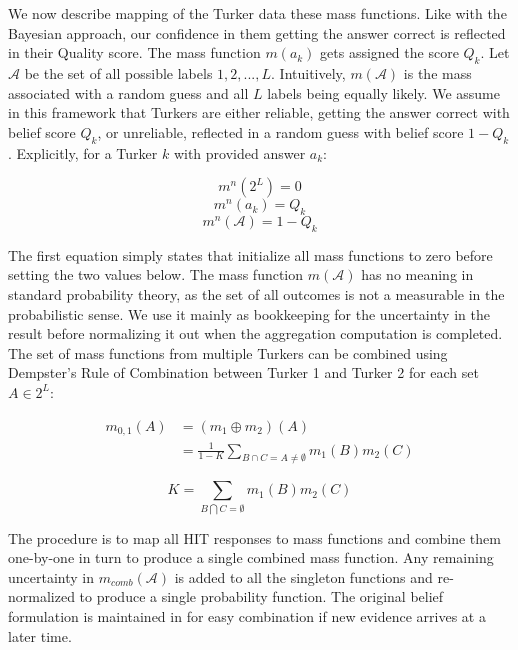 We now describe mapping of the Turker data these mass functions.  Like with the Bayesian approach, our confidence in them getting the answer correct is reflected in their Quality score.  The mass function $m(a_{k})$ gets assigned the score $Q_{k}$.  Let $\mathcal{A}$ be the set of all possible labels ${1,2,...,L}$.  Intuitively, $m(\mathcal{A})$ is the mass associated with a random guess and all $L$ labels being equally likely.  We assume in this framework that Turkers are either reliable, getting the answer correct with belief score $Q_{k}$, or unreliable, reflected in a random guess with belief score $1-Q_{k}$.  Explicitly, for a Turker $k$ with provided answer $a_{k}$:

\begin{equation}
m^{n}(2^{L}) = 0
\end{equation}
\begin{equation}
m^{n}(a_{k}) = Q_{k}
\end{equation}
\begin{equation}
m^{n}(\mathcal{A}) = 1-Q_{k}
\end{equation}

The first equation simply states that initialize all mass functions to zero before setting the two values below.  The mass function $m(\mathcal{A})$ has no meaning in standard probability theory, as the set of all outcomes is not a measurable in the probabilistic sense.  We use it mainly as bookkeeping for the uncertainty in the result before normalizing it out when the aggregation computation is completed.  The set of mass functions from multiple Turkers can be combined using Dempster's Rule of Combination between Turker 1 and Turker 2 for each set $A\in2^{L}$:

\begin{equation}
\begin{split}
m_{0,1}(A) &=(m_{1}\oplus m_{2})(A)\\
                   &=\frac{1}{1-K} \sum_{B\cap C=A\neq\emptyset} m_{1}(B)m_{2}(C)
\end{split}
\end{equation}

\begin{equation}
K=\sum_{B\bigcap C=\emptyset}m_{1}(B)m_{2}(C)
\end{equation}

The procedure is to map all HIT responses to mass functions and combine them one-by-one in turn to produce a single combined mass function.  Any remaining uncertainty in $m_{comb}(\mathcal{A})$ is added to all the singleton functions and re-normalized to produce a single probability function.  The original belief formulation is maintained in \sysName for easy combination if new evidence arrives at a later time.

